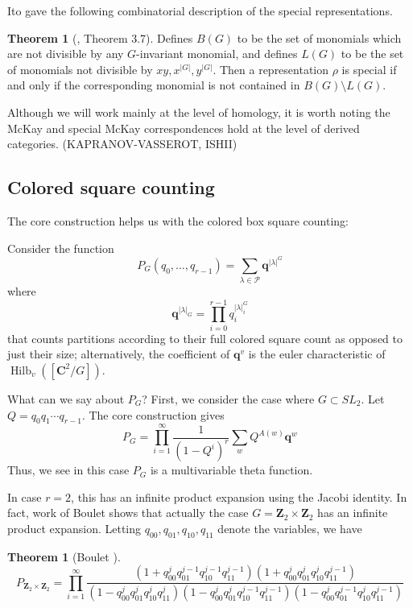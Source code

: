 \documentclass{amsart}[12pt]
\theoremstyle{definition}
\newtheorem{theorem}[dummy]{Theorem}
\newcommand{\Z}{\mathbf{Z}}
\newcommand{\C}{\mathbf{C}}
\DeclareMathOperator{\Hilb}{Hilb}
\begin{document}
Ito \cite{ito} gave the following combinatorial description of the special representations.  

\begin{theorem}[\cite{ito}, Theorem 3.7]
Defines $B(G)$ to be the set of monomials which are not divisible by any $G$-invariant monomial, and defines $L(G)$ to be the set of monomials not divisible by $xy, x^{|G|}, y^{|G|}$.  Then a representation $\rho$ is special if and only if the corresponding monomial is not contained in $B(G)\setminus L(G)$.
\end{theorem}


Although we will work mainly at the level of homology, it is worth noting the McKay and special McKay correspondences hold at the level of derived categories.  (KAPRANOV-VASSEROT, ISHII)


\subsection{Colored square counting}

The core construction helps us with the colored box square counting:

Consider the function
$$P_G(q_0,\dots,q_{r-1})=\sum_{\lambda\in\mathcal{P}} \mathbf{q}^{|\lambda|^G}$$
where 
$$\mathbf{q}^{|\lambda|_G}=\prod_{i=0}^{r-1} q_i^{|\lambda|^G_i}$$
that counts partitions according to their full colored square count as opposed to just their size; alternatively, the coefficient of $\mathbf{q}^v$ is the euler characteristic of $\Hilb_v([\C^2/G])$.

What can we say about $P_G$?  First, we consider the case where $G\subset SL_2$.  Let $Q=q_0q_1\cdots q_{r-1}$.  The core construction gives
$$P_G=\prod_{i=1}^\infty\frac{1}{(1-Q^i)^r} \sum_{w} Q^{A(w)}\mathbf{q}^w $$
Thus, we see in this case $P_G$ is a multivariable theta function.

In case $r=2$, this has an infinite product expansion using the Jacobi identity.  In fact, work of Boulet shows that actually the case $G=\Z_2\times \Z_2$ has an infinite product expansion.  Letting $q_{00}, q_{01}, q_{10}, q_{11}$ denote the variables, we have

\begin{theorem}[Boulet \cite{boulet}]
$$P_{\Z_2\times\Z_2}=\prod_{i=1}^\infty \frac{(1+q_{00}^jq_{01}^{j-1}q_{10}^{j-1}q_{11}^{j-1})(1+q_{00}^jq_{01}^jq_{10}^jq_{11}^{j-1})}{(1-q_{00}^jq_{01}^jq_{10}^jq_{11}^j)(1-q_{00}^jq_{01}^jq_{10}^{j-1}q_{11}^{j-1})(1-q_{00}^jq_{01}^{j-1}q_{10}^{j}q_{11}^{j-1})}$$
\end{theorem}
\end{document}
